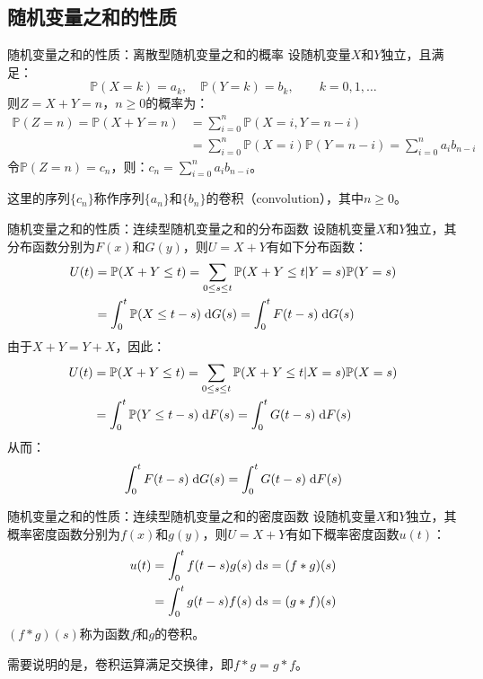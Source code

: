 \documentclass[t]{beamer}
\newcommand{\dif}{{\;\rm d}}
\renewcommand{\Pr}{\mathbb{P}}
\begin{document}
  \subsection{随机变量之和的性质}
  \begin{frame}{随机变量之和的性质：离散型随机变量之和的概率}
      设随机变量$X$和$Y$独立，且满足：
      \[\Pr(X=k)=a_k,\quad \Pr(Y=k)=b_k, \qquad k=0,1,\ldots \]
      则$Z=X+Y=n$，$n\ge 0$的概率为：
      \[\begin{split}
      \Pr(Z=n)=\Pr(X+Y=n)&=\sum^{n}_{i=0}\Pr(X=i, Y=n-i)\\
      &=\sum^{n}_{i=0}\Pr(X=i)\Pr(Y=n-i)=\sum^{n}_{i=0}a_ib_{n-i}
      \end{split} \]
      令$\Pr(Z=n)=c_n$，则：$c_n=\displaystyle\sum^{n}_{i=0}a_ib_{n-i}$。
  
      这里的序列$\{c_n\}$称作序列$\{a_n\}$和$\{b_n\}$的{卷积（convolution）}，其中$n\ge
0$。
  \end{frame}


  \begin{frame}{随机变量之和的性质：连续型随机变量之和的分布函数}
    \small
    设随机变量$X$和$Y$独立，其{分布函数}分别为$F(x)$和$G(y)$，则$U=X+Y$有如下{分布函数}：
    \[\begin{split}
    U(t)&=\Pr(X+Y\le t)=\sum_{0\le s\le t}\Pr(X+Y\le
    t|Y=s)\Pr(Y=s)\\
    &=\int^t_0 \Pr(X\le t-s)\dif G(s)=\int^t_0 F(t-s)\dif G(s)
    \end{split} \] 
    由于$X+Y=Y+X$，因此：
    \[\begin{split}
    U(t)&=\Pr(X+Y\le t)=\sum_{0\le s\le t}\Pr(X+Y\le
    t|X=s)\Pr(X=s)\\
    &=\int^t_0 \Pr(Y\le t-s)\dif F(s)=\int^t_0 G(t-s)\dif F(s)
    \end{split} \] 
    从而：
    \[\int^t_0 F(t-s)\dif G(s)=\int^t_0 G(t-s)\dif F(s)\]
  \end{frame}
  
  \begin{frame}{随机变量之和的性质：连续型随机变量之和的密度函数}
    设随机变量$X$和$Y$独立，其{概率密度函数}分别为$f(x)$和$g(y)$，则$U=X+Y$有如下{概率密度函数}$u(t)$：
    \[\begin{split}
    u(t)&=\int^{t}_{0} f(t-s) g(s)\dif s=(f*g)(s)\\
    &=\int^{t}_{0} g(t-s) f(s)\dif s=(g*f)(s)
    \end{split} \] 
    $(f*g)(s)$称为函数$f$和$g$的卷积。
  
    需要说明的是，卷积运算满足交换律，即$f*g=g*f$。
  \end{frame}
\end{document}
